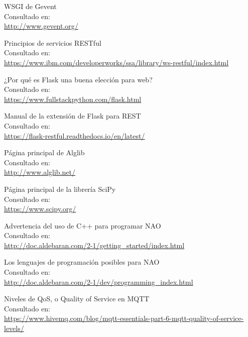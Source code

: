 \documentclass[12pt,spanish,listoffigures,listoftables]{tfgetsinf}
\begin{document}
\begin{thebibliography}{10}
	WSGI de Gevent \\
	\newblock Consultado en: \\
	\url{http://www.gevent.org/}
	
	Principios de servicios RESTful \\
	\newblock Consultado en: \\
	\url{https://www.ibm.com/developerworks/ssa/library/ws-restful/index.html}
	
	¿Por qué es Flask una buena elección para web? \\
	\newblock Consultado en: \\
	\url{https://www.fullstackpython.com/flask.html}
	
	Manual de la extensión de Flask para REST \\
	\newblock Consultado en: \\
	\url{https://flask-restful.readthedocs.io/en/latest/}
	
	Página principal de Alglib \\
	\newblock Consultado en: \\
	\url{http://www.alglib.net/}
	
	Página principal de la librería SciPy\\
	\newblock Consultado en: \\
	\url{https://www.scipy.org/}
	
	Advertencia del uso de C++ para programar NAO\\
	\newblock Consultado en: \\
	\url{http://doc.aldebaran.com/2-1/getting_started/index.html}
	
	Los lenguajes de programación posibles para NAO\\
	\newblock Consultado en: \\
	\url{http://doc.aldebaran.com/2-1/dev/programming_index.html}
	
	Niveles de QoS, o Quality of Service en MQTT\\
	\newblock Consultado en: \\
	\url{https://www.hivemq.com/blog/mqtt-essentials-part-6-mqtt-quality-of-service-levels/}
	

\end{thebibliography}
\cleardoublepage

\end{document}
